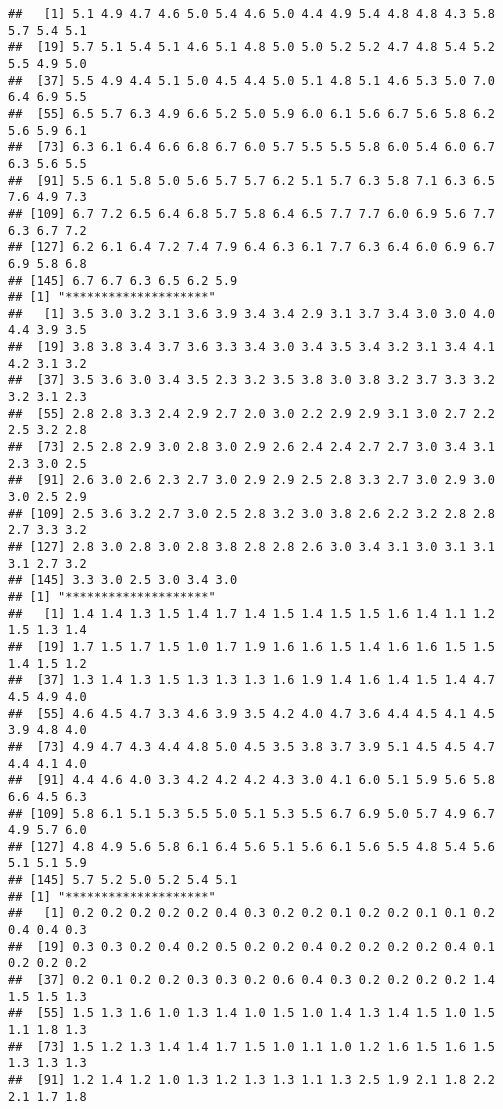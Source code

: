 \documentclass[
]{article}
\begin{document}
\begin{verbatim}
##   [1] 5.1 4.9 4.7 4.6 5.0 5.4 4.6 5.0 4.4 4.9 5.4 4.8 4.8 4.3 5.8 5.7 5.4 5.1
##  [19] 5.7 5.1 5.4 5.1 4.6 5.1 4.8 5.0 5.0 5.2 5.2 4.7 4.8 5.4 5.2 5.5 4.9 5.0
##  [37] 5.5 4.9 4.4 5.1 5.0 4.5 4.4 5.0 5.1 4.8 5.1 4.6 5.3 5.0 7.0 6.4 6.9 5.5
##  [55] 6.5 5.7 6.3 4.9 6.6 5.2 5.0 5.9 6.0 6.1 5.6 6.7 5.6 5.8 6.2 5.6 5.9 6.1
##  [73] 6.3 6.1 6.4 6.6 6.8 6.7 6.0 5.7 5.5 5.5 5.8 6.0 5.4 6.0 6.7 6.3 5.6 5.5
##  [91] 5.5 6.1 5.8 5.0 5.6 5.7 5.7 6.2 5.1 5.7 6.3 5.8 7.1 6.3 6.5 7.6 4.9 7.3
## [109] 6.7 7.2 6.5 6.4 6.8 5.7 5.8 6.4 6.5 7.7 7.7 6.0 6.9 5.6 7.7 6.3 6.7 7.2
## [127] 6.2 6.1 6.4 7.2 7.4 7.9 6.4 6.3 6.1 7.7 6.3 6.4 6.0 6.9 6.7 6.9 5.8 6.8
## [145] 6.7 6.7 6.3 6.5 6.2 5.9
## [1] "********************"
##   [1] 3.5 3.0 3.2 3.1 3.6 3.9 3.4 3.4 2.9 3.1 3.7 3.4 3.0 3.0 4.0 4.4 3.9 3.5
##  [19] 3.8 3.8 3.4 3.7 3.6 3.3 3.4 3.0 3.4 3.5 3.4 3.2 3.1 3.4 4.1 4.2 3.1 3.2
##  [37] 3.5 3.6 3.0 3.4 3.5 2.3 3.2 3.5 3.8 3.0 3.8 3.2 3.7 3.3 3.2 3.2 3.1 2.3
##  [55] 2.8 2.8 3.3 2.4 2.9 2.7 2.0 3.0 2.2 2.9 2.9 3.1 3.0 2.7 2.2 2.5 3.2 2.8
##  [73] 2.5 2.8 2.9 3.0 2.8 3.0 2.9 2.6 2.4 2.4 2.7 2.7 3.0 3.4 3.1 2.3 3.0 2.5
##  [91] 2.6 3.0 2.6 2.3 2.7 3.0 2.9 2.9 2.5 2.8 3.3 2.7 3.0 2.9 3.0 3.0 2.5 2.9
## [109] 2.5 3.6 3.2 2.7 3.0 2.5 2.8 3.2 3.0 3.8 2.6 2.2 3.2 2.8 2.8 2.7 3.3 3.2
## [127] 2.8 3.0 2.8 3.0 2.8 3.8 2.8 2.8 2.6 3.0 3.4 3.1 3.0 3.1 3.1 3.1 2.7 3.2
## [145] 3.3 3.0 2.5 3.0 3.4 3.0
## [1] "********************"
##   [1] 1.4 1.4 1.3 1.5 1.4 1.7 1.4 1.5 1.4 1.5 1.5 1.6 1.4 1.1 1.2 1.5 1.3 1.4
##  [19] 1.7 1.5 1.7 1.5 1.0 1.7 1.9 1.6 1.6 1.5 1.4 1.6 1.6 1.5 1.5 1.4 1.5 1.2
##  [37] 1.3 1.4 1.3 1.5 1.3 1.3 1.3 1.6 1.9 1.4 1.6 1.4 1.5 1.4 4.7 4.5 4.9 4.0
##  [55] 4.6 4.5 4.7 3.3 4.6 3.9 3.5 4.2 4.0 4.7 3.6 4.4 4.5 4.1 4.5 3.9 4.8 4.0
##  [73] 4.9 4.7 4.3 4.4 4.8 5.0 4.5 3.5 3.8 3.7 3.9 5.1 4.5 4.5 4.7 4.4 4.1 4.0
##  [91] 4.4 4.6 4.0 3.3 4.2 4.2 4.2 4.3 3.0 4.1 6.0 5.1 5.9 5.6 5.8 6.6 4.5 6.3
## [109] 5.8 6.1 5.1 5.3 5.5 5.0 5.1 5.3 5.5 6.7 6.9 5.0 5.7 4.9 6.7 4.9 5.7 6.0
## [127] 4.8 4.9 5.6 5.8 6.1 6.4 5.6 5.1 5.6 6.1 5.6 5.5 4.8 5.4 5.6 5.1 5.1 5.9
## [145] 5.7 5.2 5.0 5.2 5.4 5.1
## [1] "********************"
##   [1] 0.2 0.2 0.2 0.2 0.2 0.4 0.3 0.2 0.2 0.1 0.2 0.2 0.1 0.1 0.2 0.4 0.4 0.3
##  [19] 0.3 0.3 0.2 0.4 0.2 0.5 0.2 0.2 0.4 0.2 0.2 0.2 0.2 0.4 0.1 0.2 0.2 0.2
##  [37] 0.2 0.1 0.2 0.2 0.3 0.3 0.2 0.6 0.4 0.3 0.2 0.2 0.2 0.2 1.4 1.5 1.5 1.3
##  [55] 1.5 1.3 1.6 1.0 1.3 1.4 1.0 1.5 1.0 1.4 1.3 1.4 1.5 1.0 1.5 1.1 1.8 1.3
##  [73] 1.5 1.2 1.3 1.4 1.4 1.7 1.5 1.0 1.1 1.0 1.2 1.6 1.5 1.6 1.5 1.3 1.3 1.3
##  [91] 1.2 1.4 1.2 1.0 1.3 1.2 1.3 1.3 1.1 1.3 2.5 1.9 2.1 1.8 2.2 2.1 1.7 1.8

\end{verbatim}
\end{document}
